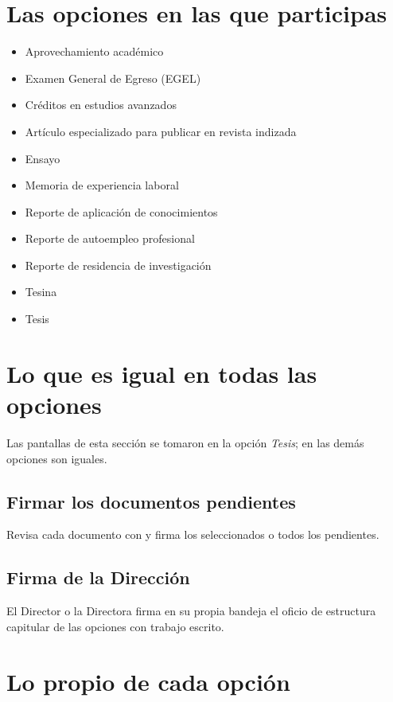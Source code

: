 \section{Las opciones en las que participas}
\begin{itemize}
  \item Aprovechamiento académico
  \item Examen General de Egreso (EGEL)
  \item Créditos en estudios avanzados
  \item Artículo especializado para publicar en revista indizada
  \item Ensayo
  \item Memoria de experiencia laboral
  \item Reporte de aplicación de conocimientos
  \item Reporte de autoempleo profesional
  \item Reporte de residencia de investigación
  \item Tesina
  \item Tesis
\end{itemize}
\section{Lo que es igual en todas las opciones}
Las pantallas de esta sección se tomaron en la opción \emph{Tesis}; en las demás opciones son iguales.
\subsection{Firmar los documentos pendientes}
Revisa cada documento con  y firma los seleccionados o todos los pendientes.
\subsection{Firma de la Dirección}
El Director o la Directora firma en su propia bandeja el oficio de estructura capitular de las opciones con trabajo escrito.
\section{Lo propio de cada opción}
